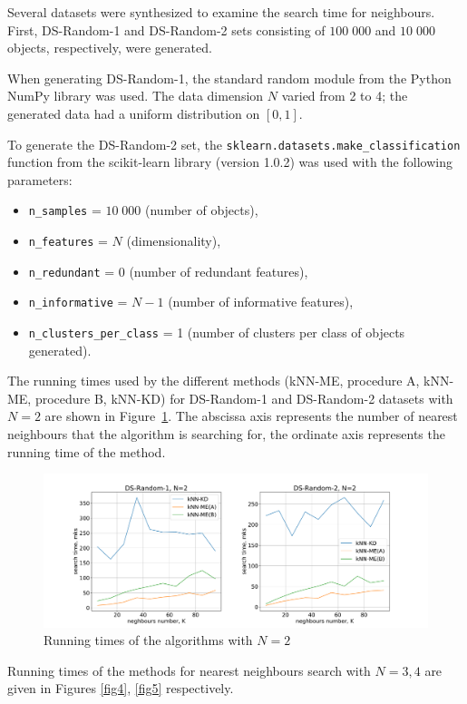 \documentclass[entropy,article,submit,moreauthors,pdftex]{Definitions/mdpi}
\begin{document}
\begin{paracol}{2}
Several datasets were synthesized to examine the search time for neighbours. First, DS-Random-1 and DS-Random-2 sets consisting of $100\;000$ and $10\;000$ objects, respectively, were generated.

When generating DS-Random-1, the standard random module from the Python NumPy library was used. The data dimension $N$ varied from 2 to 4; the generated data had a uniform distribution on $[0, 1]$.

To generate the DS-Random-2 set, the \texttt{sklearn.datasets.make\_classification} function from the scikit-learn library (version 1.0.2) was used with the following parameters: 

\begin{itemize}
\item \texttt{n\_samples} = $10\;000$ (number of objects),
\item \texttt{n\_features} =  $N$ (dimensionality),
\item \texttt{n\_redundant} = 0 (number of redundant features),
\item \texttt{n\_informative} = $N - 1$  (number of informative features),
\item \texttt{n\_clusters\_per\_class} = 1 (number of clusters per class of objects generated).
\end{itemize}
  
The running times used by the different methods (kNN-ME, procedure A, kNN-ME, procedure B, kNN-KD) for DS-Random-1 and DS-Random-2 datasets with $N = 2$ are shown in Figure~\ref{fig3}. The abscissa axis represents the number of nearest neighbours that the algorithm is searching for, the ordinate axis represents the running time of the method.

\begin{figure}
\widefigure
\includegraphics[width=1.0\linewidth]{fig3.pdf}
\caption{Running times of the algorithms with $N = 2$\label{fig3}}
\end{figure}  

Running times of the methods for nearest neighbours search with $N = 3, 4$ are given in Figures \ref{fig4}, \ref{fig5} respectively.


\end{paracol}
\end{document}
